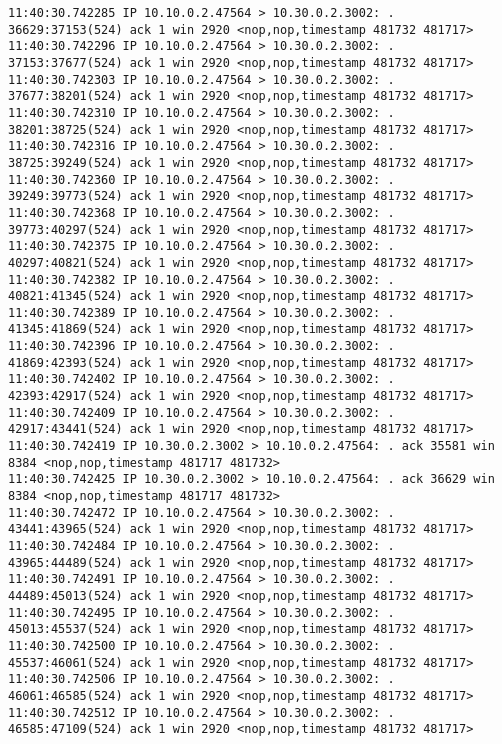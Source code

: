 \documentclass[a4paper,12pt]{article}
\begin{document}
\begin{lstlisting}
11:40:30.742285 IP 10.10.0.2.47564 > 10.30.0.2.3002: . 36629:37153(524) ack 1 win 2920 <nop,nop,timestamp 481732 481717>
11:40:30.742296 IP 10.10.0.2.47564 > 10.30.0.2.3002: . 37153:37677(524) ack 1 win 2920 <nop,nop,timestamp 481732 481717>
11:40:30.742303 IP 10.10.0.2.47564 > 10.30.0.2.3002: . 37677:38201(524) ack 1 win 2920 <nop,nop,timestamp 481732 481717>
11:40:30.742310 IP 10.10.0.2.47564 > 10.30.0.2.3002: . 38201:38725(524) ack 1 win 2920 <nop,nop,timestamp 481732 481717>
11:40:30.742316 IP 10.10.0.2.47564 > 10.30.0.2.3002: . 38725:39249(524) ack 1 win 2920 <nop,nop,timestamp 481732 481717>
11:40:30.742360 IP 10.10.0.2.47564 > 10.30.0.2.3002: . 39249:39773(524) ack 1 win 2920 <nop,nop,timestamp 481732 481717>
11:40:30.742368 IP 10.10.0.2.47564 > 10.30.0.2.3002: . 39773:40297(524) ack 1 win 2920 <nop,nop,timestamp 481732 481717>
11:40:30.742375 IP 10.10.0.2.47564 > 10.30.0.2.3002: . 40297:40821(524) ack 1 win 2920 <nop,nop,timestamp 481732 481717>
11:40:30.742382 IP 10.10.0.2.47564 > 10.30.0.2.3002: . 40821:41345(524) ack 1 win 2920 <nop,nop,timestamp 481732 481717>
11:40:30.742389 IP 10.10.0.2.47564 > 10.30.0.2.3002: . 41345:41869(524) ack 1 win 2920 <nop,nop,timestamp 481732 481717>
11:40:30.742396 IP 10.10.0.2.47564 > 10.30.0.2.3002: . 41869:42393(524) ack 1 win 2920 <nop,nop,timestamp 481732 481717>
11:40:30.742402 IP 10.10.0.2.47564 > 10.30.0.2.3002: . 42393:42917(524) ack 1 win 2920 <nop,nop,timestamp 481732 481717>
11:40:30.742409 IP 10.10.0.2.47564 > 10.30.0.2.3002: . 42917:43441(524) ack 1 win 2920 <nop,nop,timestamp 481732 481717>
11:40:30.742419 IP 10.30.0.2.3002 > 10.10.0.2.47564: . ack 35581 win 8384 <nop,nop,timestamp 481717 481732>
11:40:30.742425 IP 10.30.0.2.3002 > 10.10.0.2.47564: . ack 36629 win 8384 <nop,nop,timestamp 481717 481732>
11:40:30.742472 IP 10.10.0.2.47564 > 10.30.0.2.3002: . 43441:43965(524) ack 1 win 2920 <nop,nop,timestamp 481732 481717>
11:40:30.742484 IP 10.10.0.2.47564 > 10.30.0.2.3002: . 43965:44489(524) ack 1 win 2920 <nop,nop,timestamp 481732 481717>
11:40:30.742491 IP 10.10.0.2.47564 > 10.30.0.2.3002: . 44489:45013(524) ack 1 win 2920 <nop,nop,timestamp 481732 481717>
11:40:30.742495 IP 10.10.0.2.47564 > 10.30.0.2.3002: . 45013:45537(524) ack 1 win 2920 <nop,nop,timestamp 481732 481717>
11:40:30.742500 IP 10.10.0.2.47564 > 10.30.0.2.3002: . 45537:46061(524) ack 1 win 2920 <nop,nop,timestamp 481732 481717>
11:40:30.742506 IP 10.10.0.2.47564 > 10.30.0.2.3002: . 46061:46585(524) ack 1 win 2920 <nop,nop,timestamp 481732 481717>
11:40:30.742512 IP 10.10.0.2.47564 > 10.30.0.2.3002: . 46585:47109(524) ack 1 win 2920 <nop,nop,timestamp 481732 481717>

\end{lstlisting}
\end{document}
